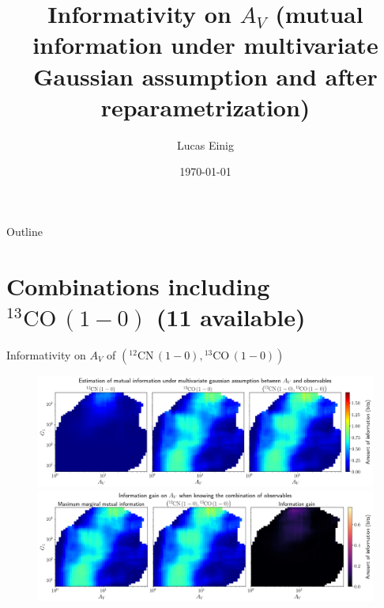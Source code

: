 \documentclass{beamer}
\title{Informativity on $A_V$ (mutual information under multivariate Gaussian assumption and after reparametrization)}
\author{Lucas Einig}
\institute{IRAM - GIPSA-lab}
\date{\today}
\begin{document}
\begin{frame}
  \titlepage
\end{frame}

\begin{frame}{Outline}
  \tableofcontents
\end{frame}


\section{Combinations including $\mathrm{^{13}CO\,(1-0)}$ (11 available)}

\begin{frame}{Informativity on $A_V$ of $\left(\mathrm{^{12}CN\,(1-0)},\mathrm{^{13}CO\,(1-0)}\right)$}
    \begin{figure}
        \centering
        \includegraphics[width=0.95\linewidth]{../linearinfogauss/av__12cn10_13co10_linearinfogauss.png}
        \vfill
        \includegraphics[width=0.95\linewidth]{../linearinfogauss/av__12cn10_13co10_linearinfogauss_gain.png}
    \end{figure}
\end{frame}
\end{document}
